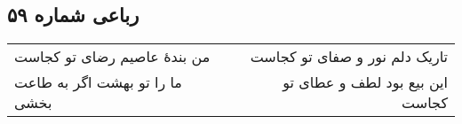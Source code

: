 \begin{center}
\section*{رباعی شماره ۵۹}
\label{sec:sh059}
\begin{longtable}{l p{0.5cm} r}
من بندهٔ عاصیم رضای تو کجاست
&&
تاریک دلم نور و صفای تو کجاست
\\
ما را تو بهشت اگر به طاعت بخشی
&&
این بیع بود لطف و عطای تو کجاست
\\
\end{longtable}
\end{center}
